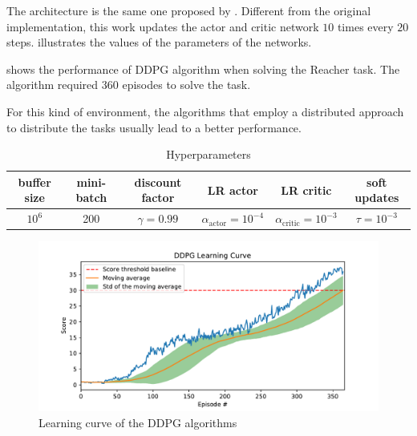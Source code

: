 \documentclass[12pt,english]{article}
\begin{document}
The architecture is the same one proposed by \citeauthor{lillicrap:16}\cite{lillicrap:16}. Different from the original implementation, this work updates the actor and critic network \(10\) times every \(20\) steps.  illustrates the values of the parameters of the networks. 

 shows the performance of DDPG algorithm when solving the Reacher task. The algorithm required \(360\) episodes to solve the task.

For this kind of environment, the algorithms that employ a distributed approach to distribute the tasks usually lead to a better performance.

\begin{table}
\footnotesize
{
  \caption{Hyperparameters}\label{tb:parameters}
  \centering
  \begin{tabular}{cccccc}
  \toprule
    \textbf{buffer size} & \textbf{mini-batch} & \textbf{discount factor} & \textbf{LR actor} & \textbf{LR critic} & \textbf{soft updates}\\
  \midrule
   \(10^6\) & 200 & \(\gamma = 0.99\) & \(\alpha_{\text{actor}} = 10^{-4}\) & \(\alpha_{\text{critic}} = 10^{-3}\) & \(\tau=10^{-3}\)\\
  \bottomrule
  \end{tabular}
}
\end{table}


\begin{figure}%
    \centering
    \includegraphics[width=\textwidth]{ddpg_score}
    \caption{Learning curve of the DDPG algorithms}\label{fig:score}
\end{figure}



\end{document}
